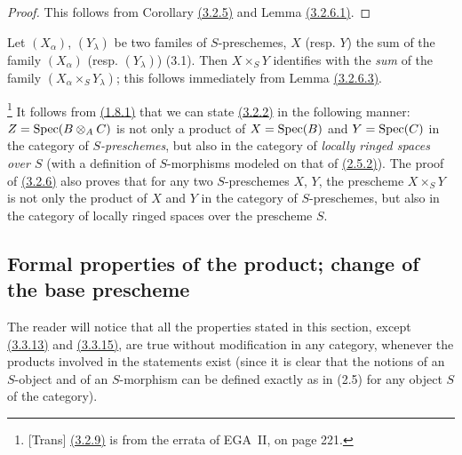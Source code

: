 \begin{proof}
\label{proof-cor-1.3.2.7}
This follows from Corollary \hyperref[cor-1.3.2.5]{(3.2.5)} and Lemma \hyperref[lem-1.3.2.6.1]{(3.2.6.1)}.
\end{proof}

\begin{env}[3.2.8]
\label{env-1.3.2.8}
Let $(X_\alpha)$, $(Y_\lambda)$ be two familes of $S$-preschemes, $X$ (resp. $Y$) the sum
of the family $(X_\alpha)$ (resp. $(Y_\lambda)$) (3.1). Then $X\times_S Y$ identifies with
the {\em sum} of the family $(X_\alpha\times_S Y_\lambda)$; this follows immediately from
Lemma \hyperref[lem-1.3.2.6.3]{(3.2.6.3)}.
\end{env}

\begin{env}[3.2.9]
\label{env-1.3.2.9}
\footnote{[Trans] \hyperref[env-1.3.2.9]{(3.2.9)} is from the errata of EGA~II, on page 221.}
It follows from \hyperref[prop-1.1.8.1]{(1.8.1)} that we can state \hyperref[prop-1.3.2.2]{(3.2.2)} in the following
manner: $Z={\mathop{\mathrm{Spec}}\nolimits}(B\otimes_A C)$ is not only a product of $X={\mathop{\mathrm{Spec}}\nolimits}(B)$ and $Y={\mathop{\mathrm{Spec}}\nolimits}(C)$ in the
category of {\em $S$-preschemes}, but also in the category of {\em locally ringed spaces
over $S$} (with a definition of $S$-morphisms modeled on that of \hyperref[env-1.2.5.2]{(2.5.2)}). The
proof of \hyperref[thm-1.3.2.6]{(3.2.6)} also proves that for any two $S$-preschemes $X$, $Y$, the
prescheme $X\times_S Y$ is not only the product of $X$ and $Y$ in the category of
$S$-preschemes, but also in the category of locally ringed spaces over the prescheme $S$.
\end{env}

\subsection{Formal properties of the product; change of the base prescheme}
\label{subsection-product-formal-prop-and-base-change}

\begin{env}[3.3.1]
\label{env-1.3.3.1}
The reader will notice that all the properties stated in this section, except
\hyperref[env-1.3.3.13]{(3.3.13)} and \hyperref[env-1.3.3.15]{(3.3.15)}, are true without modification in any
category, whenever the products involved in the statements exist (since it is
clear that the notions of an $S$-object and of an $S$-morphism can be defined
exactly as in (2.5) for any object $S$ of the category).
\end{env}

